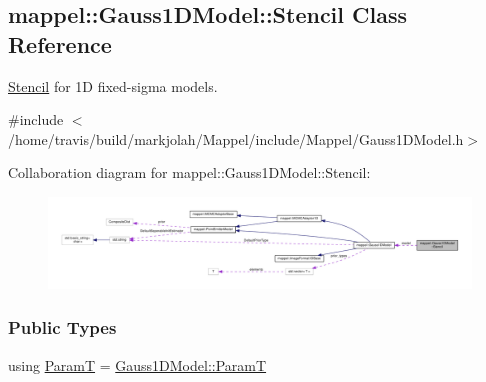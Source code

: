 \hypertarget{classmappel_1_1Gauss1DModel_1_1Stencil}{}\subsection{mappel\+:\+:Gauss1\+D\+Model\+:\+:Stencil Class Reference}
\label{classmappel_1_1Gauss1DModel_1_1Stencil}


\hyperlink{classmappel_1_1Gauss1DModel_1_1Stencil}{Stencil} for 1D fixed-\/sigma models.  




{\ttfamily \#include $<$/home/travis/build/markjolah/\+Mappel/include/\+Mappel/\+Gauss1\+D\+Model.\+h$>$}



Collaboration diagram for mappel\+:\+:Gauss1\+D\+Model\+:\+:Stencil\+:\nopagebreak
\begin{figure}[H]
\begin{center}
\leavevmode
\includegraphics[width=350pt]{classmappel_1_1Gauss1DModel_1_1Stencil__coll__graph}
\end{center}
\end{figure}
\subsubsection*{Public Types}
\begin{DoxyCompactItemize}
\item 
using \hyperlink{classmappel_1_1Gauss1DModel_1_1Stencil_a861a81c7bbd677e31bf3ab20467a2adc}{ParamT} = \hyperlink{classmappel_1_1PointEmitterModel_a665ec6aea3aac139bb69a23c06d4b9a1}{Gauss1\+D\+Model\+::\+ParamT}
\end{DoxyCompactItemize}
